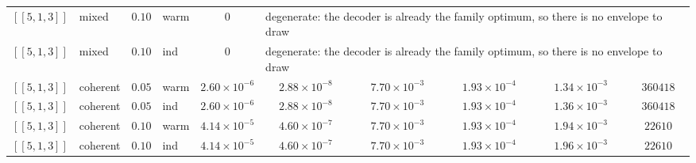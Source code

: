 \documentclass[10pt,a4paper]{article}
\begin{document}
\begin{longtable}{llclcccccc}
$[\![5,1,3]\!]$ & mixed & $0.10$ & warm & $0$ & \multicolumn{5}{l}{degenerate: the decoder is already the family optimum, so there is no envelope to draw} \\
$[\![5,1,3]\!]$ & mixed & $0.10$ & ind & $0$ & \multicolumn{5}{l}{degenerate: the decoder is already the family optimum, so there is no envelope to draw} \\
$[\![5,1,3]\!]$ & coherent & $0.05$ & warm & $2.60\times 10^{-6}$ & $2.88\times 10^{-8}$ & $7.70\times 10^{-3}$ & $1.93\times 10^{-4}$ & $1.34\times 10^{-3}$ & $360418$ \\
$[\![5,1,3]\!]$ & coherent & $0.05$ & ind & $2.60\times 10^{-6}$ & $2.88\times 10^{-8}$ & $7.70\times 10^{-3}$ & $1.93\times 10^{-4}$ & $1.36\times 10^{-3}$ & $360418$ \\
$[\![5,1,3]\!]$ & coherent & $0.10$ & warm & $4.14\times 10^{-5}$ & $4.60\times 10^{-7}$ & $7.70\times 10^{-3}$ & $1.93\times 10^{-4}$ & $1.94\times 10^{-3}$ & $22610$ \\
$[\![5,1,3]\!]$ & coherent & $0.10$ & ind & $4.14\times 10^{-5}$ & $4.60\times 10^{-7}$ & $7.70\times 10^{-3}$ & $1.93\times 10^{-4}$ & $1.96\times 10^{-3}$ & $22610$ \\
\bottomrule\end{longtable}
\end{document}
